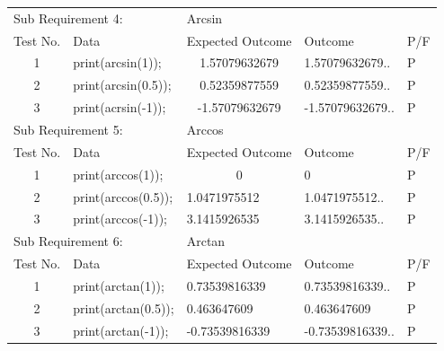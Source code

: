 \documentclass[a4paper, oneside, 11pt]{report}
\begin{document}
\begin{table}
\begin{tabular}{cllll}
\multicolumn{2}{l}{Sub Requirement 4:}             & \multicolumn{3}{l}{Arcsin}                         \\
\multicolumn{1}{l}{Test No.} & Data                & Expected Outcome                   & Outcome & P/F \\
1                            & print(arcsin(1));   & \multicolumn{1}{c}{1.57079632679}  &  1.57079632679..        &   P  \\
2                            & print(arcsin(0.5)); & \multicolumn{1}{c}{0.52359877559}  &  0.52359877559..       &  P   \\
3                            & print(acrsin(-1));  & \multicolumn{1}{c}{-1.57079632679} & -1.57079632679..        &  P   \\
\multicolumn{2}{l}{Sub Requirement 5:}             & \multicolumn{3}{l}{Arccos}                         \\
\multicolumn{1}{l}{Test No.} & Data                & Expected Outcome                   & Outcome & P/F \\
1                            & print(arccos(1));   & \multicolumn{1}{c}{0}              &    0     & P    \\
2                            & print(arccos(0.5)); & 1.0471975512                       &  1.0471975512..        &   P  \\
3                            & print(arccos(-1));  & 3.1415926535                       &  3.1415926535..       &  P   \\
\multicolumn{2}{l}{Sub Requirement 6:}             & \multicolumn{3}{l}{Arctan}                         \\
\multicolumn{1}{l}{Test No.} & Data                & Expected Outcome                   & Outcome & P/F \\
1                            & print(arctan(1));   & 0.73539816339                      &  0.73539816339..       &  P   \\
2                            & print(arctan(0.5)); & 0.463647609                        &  0.463647609       &   P  \\
3                            & print(arctan(-1));  & -0.73539816339                     & -0.73539816339..        &    P
\end{tabular}
\end{table}

\clearpage
\end{document}
